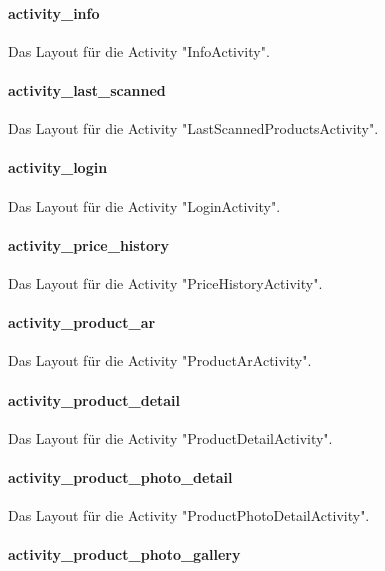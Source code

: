 \documentclass{scrartcl}
\begin{document}
\paragraph{activity\_info} \mbox{} 

\noindent Das Layout für die Activity "InfoActivity". 

\paragraph{activity\_last\_scanned} \mbox{} 

\noindent Das Layout für die Activity "LastScannedProductsActivity". 

\paragraph{activity\_login} \mbox{} 

\noindent Das Layout für die Activity "LoginActivity". 

\paragraph{activity\_price\_history} \mbox{} 

\noindent Das Layout für die Activity "PriceHistoryActivity". 

\paragraph{activity\_product\_ar} \mbox{} 

\noindent Das Layout für die Activity "ProductArActivity". 

\paragraph{activity\_product\_detail} \mbox{} 

\noindent Das Layout für die Activity "ProductDetailActivity". 

\paragraph{activity\_product\_photo\_detail} \mbox{} 

\noindent Das Layout für die Activity "ProductPhotoDetailActivity". 

\paragraph{activity\_product\_photo\_gallery} \mbox{} 
\end{document}
